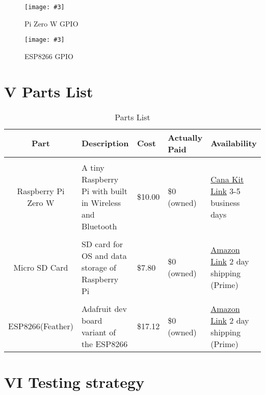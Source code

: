 \documentclass[12pt]{article}
\newcommand{\nimg}[4][width=\textwidth]{
    \begin{figure}[H]
        \centering
        \texttt{[image: \#3]}
        \caption{#4}
        \label{#2}
    \end{figure}
}
\begin{document}
    \nimg [height = 3.75 in]{Risk}{pics/Pi_Zero_pinout.png}{Pi Zero W GPIO}

    \nimg [height = 3.75 in]{Risk}{pics/feather.png}{ESP8266 GPIO}

\section{V Parts List}
\begin{table}[H]
    \centering
    \caption{Parts List}
    \label{tab:specs4}
    \begin{tabularx}{\linewidth}{cXXXX} \toprule
        Part & Description & Cost & Actually Paid & Availability\\ \midrule
        \\Raspberry Pi Zero W & A tiny Raspberry Pi with built in Wireless and Bluetooth& \$10.00 & \$0 (owned) & \href{https://www.canakit.com/raspberry-pi-zero-wireless.html?src=raspberrypi}{Cana Kit Link} 3-5 business days\\
        \\Micro SD Card & SD card for OS and data storage of Raspberry Pi& \$7.80 & \$0 (owned) & \href{https://www.amazon.com/SanDisk-Mobile-MicroSDHC-Memory-SDSDQM-B35A/dp/B004ZIENBA/ref=sr\_1\_5?ie=UTF8\&qid=1510058599\&sr=8-5\&keywords=micro+sd+card+8gb\&dpID=41hGPOLym4L\&preST=\_SX300\_QL70\_\&dpSrc=srch}{Amazon Link} 2 day shipping (Prime)\\
        \\ESP8266(Feather) & Adafruit dev board variant of the ESP8266 & \$17.12 & \$0 (owned) & \href{https://www.amazon.com/Adafruit-2821-Feather-HUZZAH-ESP8266/dp/B019MGW6N6/ref=sr\_1\_1\_sspa?ie=UTF8\&qid=1510058499\&sr=8-1-spons\&keywords=adafruit+feather\&psc=1}{Amazon Link} 2 day shipping (Prime)\\
    \end{tabularx}
\end{table}
\section{VI Testing strategy}
    
\end{document}
